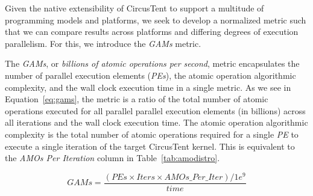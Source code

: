 Given the native extensibility of CircusTent to support a multitude of programming models and platforms, we seek to develop a normalized metric such that we can compare results across platforms and differing degrees of execution parallelism.
For this, we introduce the \textit{GAMs} metric.  

The \textit{GAMs}, or \textit{billions of atomic operations per second}, metric encapsulates the number of parallel execution elements (\textit{PEs}), the atomic operation algorithmic complexity, and the wall clock execution time in a single metric.
As we see in Equation~\ref{eq:gams}, the metric is a ratio of the total number of atomic operations executed for all parallel parallel execution elements (in billions) across all iterations and the wall clock execution time.
The atomic operation algorithmic complexity is the total number of atomic operations required for a single \textit{PE} to execute a single iteration of the target CircusTent kernel.
This is equivalent to the \textit{AMOs Per Iteration} column in Table~\ref{tab:amodistro}.  

\begin{equation}
\label{eq:gams}
  GAMs = \frac{(PEs \times Iters \times AMOs\_Per\_Iter)/1e^{9}}{time}
\end{equation}
